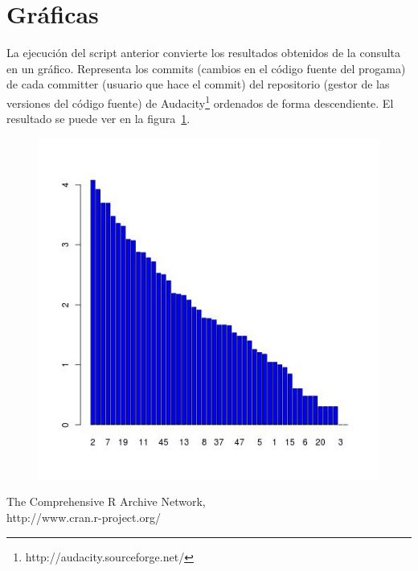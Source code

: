\documentclass[11pt]{scrartcl}
\begin{document}
\section{Gr\'aficas}

La ejecuci\'on del script anterior convierte los resultados obtenidos de la consulta en un gr\'afico. Representa los commits (cambios en el c\'odigo fuente del progama) de cada committer (usuario que hace el commit) del repositorio (gestor de las versiones del c\'odigo fuente) de Audacity\footnote{http://audacity.sourceforge.net/} ordenados de forma descendiente. El resultado se puede ver en la figura~\ref{fig:commits}.

\begin{figure}[H]
    \begin{center}
    \centering
    \includegraphics[scale=0.7]{scripts/barplot_audacity.jpg}
    \caption{}
    \label{fig:commits}
    \end{center}
\end{figure}

\begin{thebibliography}{9}

  The Comprehensive R Archive Network,\\
  http://www.cran.r-project.org/

\end{thebibliography}
\end{document}
